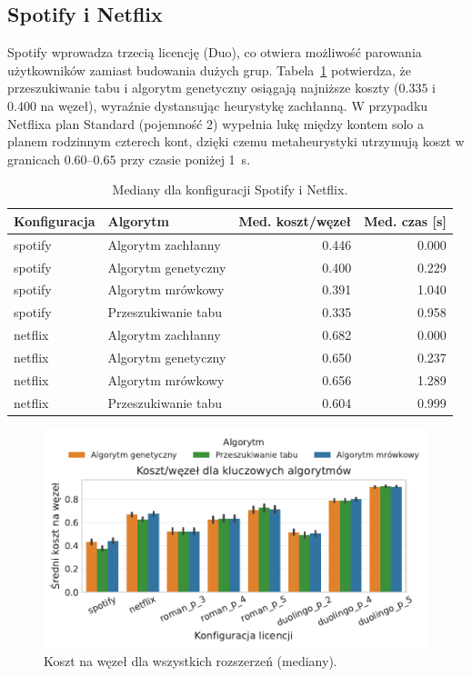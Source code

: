 \subsection{Spotify i Netflix}

Spotify wprowadza trzecią licencję (Duo), co otwiera możliwość parowania użytkowników zamiast budowania dużych grup. Tabela~\ref{tab:ext-additional-static} potwierdza, że przeszukiwanie tabu i algorytm genetyczny osiągają najniższe koszty ($0.335$ i $0.400$ na węzeł), wyraźnie dystansując heurystykę zachłanną. W przypadku Netflixa plan Standard (pojemność 2) wypełnia lukę między kontem solo a planem rodzinnym czterech kont, dzięki czemu metaheurystyki utrzymują koszt w granicach $0.60$--$0.65$ przy czasie poniżej 1~s.

\begin{table}[H]
  \centering
  \caption{Mediany dla konfiguracji Spotify i Netflix.}
  \label{tab:ext-additional-static}
  \begin{tabular}{llrr}
    \toprule
    \textbf{Konfiguracja} & \textbf{Algorytm}   & \textbf{Med. koszt/węzeł} & \textbf{Med. czas [s]} \\
    \midrule
    spotify               & Algorytm zachłanny  & 0.446                     & 0.000                  \\
    spotify               & Algorytm genetyczny & 0.400                     & 0.229                  \\
    spotify               & Algorytm mrówkowy   & 0.391                     & 1.040                  \\
    spotify               & Przeszukiwanie tabu & 0.335                     & 0.958                  \\
    netflix               & Algorytm zachłanny  & 0.682                     & 0.000                  \\
    netflix               & Algorytm genetyczny & 0.650                     & 0.237                  \\
    netflix               & Algorytm mrówkowy   & 0.656                     & 1.289                  \\
    netflix               & Przeszukiwanie tabu & 0.604                     & 0.999                  \\
  \end{tabular}
\end{table}

\begin{figure}[H]
  \centering
  \includegraphics[width=0.6\linewidth]{assets/figures/extensions/static/cost_per_node_by_license_targets.pdf}
  \caption{Koszt na węzeł dla wszystkich rozszerzeń (mediany).}
  \label{fig:ext-license-cost}
\end{figure}


